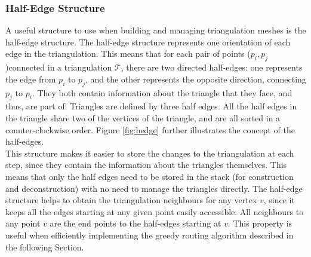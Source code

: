 \subsubsection*{Half-Edge Structure}
A useful structure to use when building and managing triangulation meshes is the half-edge structure. The half-edge structure represents one orientation of each edge in the triangulation. This means that for each pair of points ($p_i,p_j$)connected in a triangulation $\mathcal{T}$, there are two directed half-edges: one represents the edge from $p_i$ to $p_j$, and the other represents the opposite direction, connecting $p_j$ to $p_i$. They both contain information about the triangle that they face, and thus, are part of. Triangles are defined by three half edges. All the half edges in the triangle share two of the vertices of the triangle, and are all sorted in a counter-clockwise order. 
Figure \ref{fig:hedge} further illustrates the concept of the half-edges.\\

This structure makes it easier to store the changes to the triangulation at each step, since they contain the information about the triangles themselves. This means that only the half edges need to be stored in the stack (for construction and deconstruction) with no need to manage the triangles directly.
The half-edge structure helps to obtain the triangulation neighbours for any vertex $v$, since it keeps all the edges starting at any given point easily accessible. All neighbours to any point $v$ are the end points to the half-edges starting at $v$. This property is useful when efficiently implementing the greedy routing algorithm described in the following Section. 

